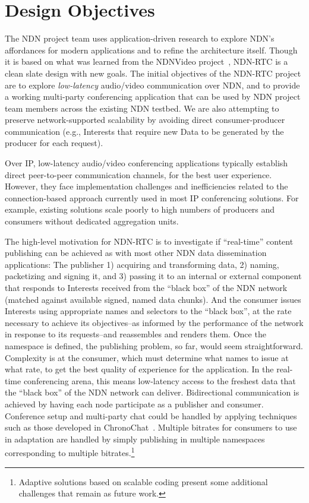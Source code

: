 \documentclass{icn/sig-alternate-2012} %
\newcommand{\ndnrtcName}{NDN-RTC} %
\begin{document}
\section{Design Objectives}
\label{sec:goals}
The NDN project team uses application-driven research to explore NDN's affordances for modern applications and to refine the architecture itself.  Though it is based on what was learned from the NDNVideo project~\cite{ndnvideo}, \ndnrtcName{} is a clean slate design with new goals.  The initial objectives of the \ndnrtcName{} project are to explore \emph{low-latency} audio/video communication over NDN, and to provide a working multi-party conferencing application that can be used by NDN project team members across the existing NDN testbed.  We are also attempting to preserve network-supported scalability by avoiding direct consumer-producer communication (e.g., Interests that require new Data to be generated by the producer for each request).  

Over IP, low-latency audio/video conferencing applications typically establish direct peer-to-peer communication channels, for the best user experience. However, they face implementation challenges and inefficiencies related to the connection-based approach currently used in most IP conferencing solutions.  For example, existing solutions scale poorly to high numbers of producers and consumers without dedicated aggregation units. 

The high-level motivation for \ndnrtcName{} is to investigate if ``real-time'' content publishing can be achieved as with most other NDN data dissemination applications: The publisher 1) acquiring and transforming data, 2) naming, packetizing and signing it, and 3) passing it to an internal or external component that responds to Interests received from the ``black box'' of the NDN network (matched against available signed, named data chunks). And the consumer issues Interests using appropriate names and selectors to the ``black box'', at the rate necessary to achieve its objectives--as informed by the performance of the network in response to its requests--and reassembles and renders them.  Once the namespace is defined, the publishing problem, so far, would seem straightforward.  Complexity is at the consumer, which must determine what names to issue at what rate, to get the best quality of experience for the application.  In the real-time conferencing arena, this means low-latency access to the freshest data that the ``black box'' of the NDN network can deliver.  Bidirectional communication is achieved by having each node participate as a publisher and consumer. Conference setup and multi-party chat could be handled by applying techniques such as those developed in ChronoChat~\cite{chronochat}. Multiple bitrates for consumers to use in adaptation are handled by simply publishing in multiple namespaces corresponding to multiple bitrates.\footnote{Adaptive solutions based on scalable coding present some additional challenges that remain as future work.} 
\end{document}
